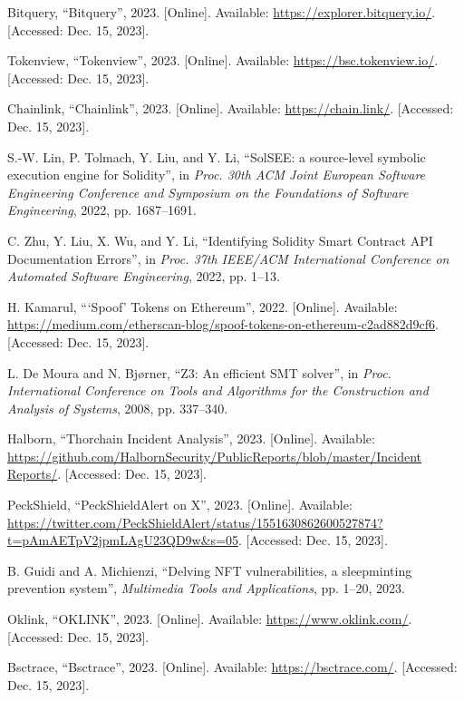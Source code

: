 \begin{thebibliography}{00}

 Bitquery, ``Bitquery'', 2023. [Online]. Available: \url{https://explorer.bitquery.io/}. [Accessed: Dec. 15, 2023].

 Tokenview, ``Tokenview'', 2023. [Online]. Available: \url{https://bsc.tokenview.io/}. [Accessed: Dec. 15, 2023].

 Chainlink, ``Chainlink'', 2023. [Online]. Available: \url{https://chain.link/}. [Accessed: Dec. 15, 2023].

 S.-W. Lin, P. Tolmach, Y. Liu, and Y. Li, ``SolSEE: a source-level symbolic execution engine for Solidity'', in \textit{Proc. 30th ACM Joint European Software Engineering Conference and Symposium on the Foundations of Software Engineering}, 2022, pp. 1687--1691.

 C. Zhu, Y. Liu, X. Wu, and Y. Li, ``Identifying Solidity Smart Contract API Documentation Errors'', in \textit{Proc. 37th IEEE/ACM International Conference on Automated Software Engineering}, 2022, pp. 1--13.

 H. Kamarul, ``‘Spoof’ Tokens on Ethereum'', 2022. [Online]. Available: \url{https://medium.com/etherscan-blog/spoof-tokens-on-ethereum-c2ad882d9cf6}. [Accessed: Dec. 15, 2023].

 L. De Moura and N. Bj{\o}rner, ``Z3: An efficient SMT solver'', in \textit{Proc. International Conference on Tools and Algorithms for the Construction and Analysis of Systems}, 2008, pp. 337--340.

 Halborn, ``Thorchain Incident Analysis'', 2023. [Online]. Available: \url{https://github.com/HalbornSecurity/PublicReports/blob/master/Incident Reports/}. [Accessed: Dec. 15, 2023].

 PeckShield, ``PeckShieldAlert on X'', 2023. [Online]. Available: \url{https://twitter.com/PeckShieldAlert/status/1551630862600527874?t=pAmAETpV2jpmLAgU23QD9w&s=05}. [Accessed: Dec. 15, 2023].

 B. Guidi and A. Michienzi, ``Delving NFT vulnerabilities, a sleepminting prevention system'', \textit{Multimedia Tools and Applications}, pp. 1--20, 2023.

 Oklink, ``OKLINK'', 2023. [Online]. Available: \url{https://www.oklink.com/}. [Accessed: Dec. 15, 2023].

 Bsctrace, ``Bsctrace'', 2023. [Online]. Available: \url{https://bsctrace.com/}. [Accessed: Dec. 15, 2023].


\end{thebibliography}
